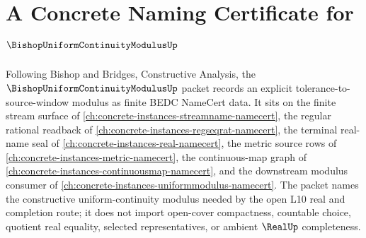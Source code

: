 \chapter{A Concrete Naming Certificate for $\BishopUniformContinuityModulusUp$}
\label{ch:concrete-instances-bishop-uniform-continuity-modulus-namecert}

Following Bishop and Bridges, Constructive Analysis, the $\BishopUniformContinuityModulusUp$ packet records an explicit tolerance-to-source-window modulus as finite BEDC NameCert data. It sits on the finite stream surface of \autoref{ch:concrete-instances-streamname-namecert}, the regular rational readback of \autoref{ch:concrete-instances-regseqrat-namecert}, the terminal real-name seal of \autoref{ch:concrete-instances-real-namecert}, the metric source rows of \autoref{ch:concrete-instances-metric-namecert}, the continuous-map graph of \autoref{ch:concrete-instances-continuousmap-namecert}, and the downstream modulus consumer of \autoref{ch:concrete-instances-uniformmodulus-namecert}. The packet names the constructive uniform-continuity modulus needed by the open L10 real and completion route; it does not import open-cover compactness, countable choice, quotient real equality, selected representatives, or ambient $\RealUp$ completeness.


